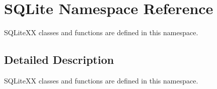 \hypertarget{a00038}{\section{S\-Q\-Lite Namespace Reference}
\label{a00038}
}


S\-Q\-Lite\-X\-X classes and functions are defined in this namespace.  




\subsection{Detailed Description}
S\-Q\-Lite\-X\-X classes and functions are defined in this namespace. 